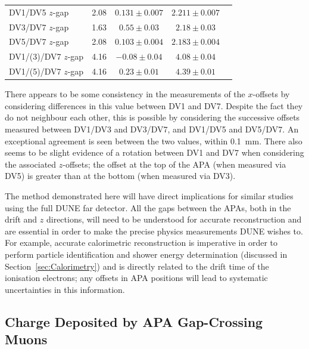 \begin{table}
\begin{tabular}{l  c  c  c  c }
      DV1/DV5 $z$-gap & 2.08 & $0.131 \pm 0.007$ & $2.211 \pm 0.007$ \\
      DV3/DV7 $z$-gap & 1.63 & $0.55 \pm 0.03$   & $2.18 \pm 0.03$   \\
      DV5/DV7 $z$-gap & 2.08 & $0.103 \pm 0.004$ & $2.183 \pm 0.004$ \\
      \midrule
      DV1/(3)/DV7 $z$-gap & 4.16 & $-0.08 \pm 0.04$ & $4.08 \pm 0.04$ \\
      DV1/(5)/DV7 $z$-gap & 4.16 & $0.23 \pm 0.01$ & $4.39 \pm 0.01$ \\
      \bottomrule
    \end{tabular}
\end{table}

There appears to be some consistency in the measurements of the $x$-offsets by considering differences in this value between DV1 and DV7.  Despite the fact they do not neighbour each other, this is possible by considering the successive offsets measured between DV1/DV3 and DV3/DV7, and DV1/DV5 and DV5/DV7.  An exceptional agreement is seen between the two values, within 0.1~mm.  There also seems to be slight evidence of a rotation between DV1 and DV7 when considering the associated $z$-offsets; the offset at the top of the APA (when measured via DV5) is greater than at the bottom (when measured via DV3).  %

The method demonstrated here will have direct implications for similar studies using the full DUNE far detector.  All the gaps between the APAs, both in the drift and $z$ directions, will need to be understood for accurate reconstruction and are essential in order to make the precise physics measurements DUNE wishes to.  For example, accurate calorimetric reconstruction is imperative in order to perform particle identification and shower energy determination (discussed in Section~\ref{sec:Calorimetry}) and is directly related to the drift time of the ionisation electrons; any offsets in APA positions will lead to systematic uncertainties in this information.

\subsection{Charge Deposited by APA Gap-Crossing Muons}\label{sec:APAGapCharge}

